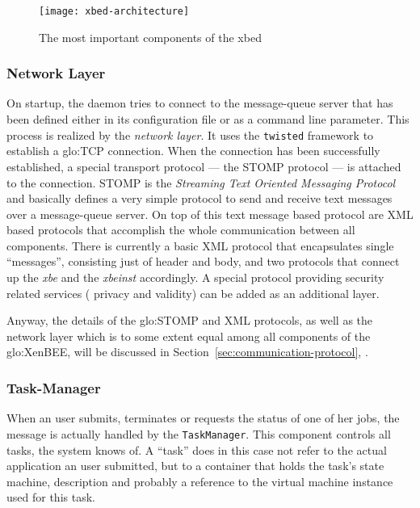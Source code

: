 \begin{figure}[ht]
  \centering
  \texttt{[image: xbed-architecture]}
  \caption[Components of the xbed]{The most important components of the xbed}
  \label{fig:xbed-architecture}
\end{figure}

\subsubsection{Network Layer}

On startup, the  daemon tries to connect to  the message-queue server that
has been  defined either in  its configuration file  or as a  command line
parameter. This process  is realized by the \emph{network  layer}. It uses
the  \texttt{twisted} framework to  establish a  \gls{glo:TCP} connection.
When the connection has been successfully established, a special transport
protocol  --- the  STOMP  protocol  \cite{stomp} ---  is  attached to  the
connection. STOMP is the \emph{Streaming Text Oriented Messaging Protocol}
and  basically defines a  very simple  protocol to  send and  receive text
messages over a  message-queue server.  On top of  this text message based
protocol are  XML based protocols that accomplish  the whole communication
between  all components.   There is  currently a  basic XML  protocol that
encapsulates single ``messages'', consisting  just of header and body, and
two  protocols  that connect  up  the  \emph{xbe}  and the  \emph{xbeinst}
accordingly.  A special protocol  providing security related services (\ie
privacy and validity) can be added as an additional layer.

Anyway, the details  of the \gls{glo:STOMP} and XML  protocols, as well as
the network  layer which is to  some extent equal among  all components of
the        \gls{glo:XenBEE},       will       be        discussed       in
Section~\ref{sec:communication-protocol},
\emph{}.

\subsubsection{Task-Manager}

When an  user submits,  terminates or  requests the status  of one  of her
jobs, the  message is actually handled by  the \texttt{TaskManager}.  This
component controls all tasks, the system knows of. A ``task'' does in this
case  not refer  to the  actual application  an user  submitted, but  to a
container that holds the task's  state machine, description and probably a
reference to the virtual machine instance used for this task.

